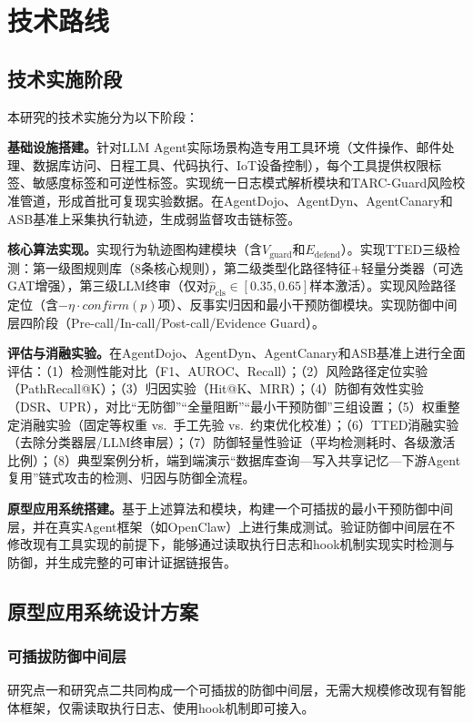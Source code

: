 \section{技术路线}

\subsection{技术实施阶段}
本研究的技术实施分为以下阶段：

\textbf{基础设施搭建。}针对LLM Agent实际场景构造专用工具环境（文件操作、邮件处理、数据库访问、日程工具、代码执行、IoT设备控制），每个工具提供权限标签、敏感度标签和可逆性标签。实现统一日志模式解析模块和TARC-Guard风险校准管道，形成首批可复现实验数据。在AgentDojo、AgentDyn、AgentCanary和ASB基准上采集执行轨迹，生成弱监督攻击链标签。

\textbf{核心算法实现。}实现行为轨迹图构建模块（含$V_{\text{guard}}$和$E_{\text{defend}}$）。实现TTED三级检测：第一级图规则库（8条核心规则），第二级类型化路径特征+轻量分类器（可选GAT增强），第三级LLM终审（仅对$\hat{p}_{\text{cls}} \in [0.35, 0.65]$样本激活）。实现风险路径定位（含$-\eta \cdot confirm(p)$项）、反事实归因和最小干预防御模块。实现防御中间层四阶段（Pre-call/In-call/Post-call/Evidence Guard）。

\textbf{评估与消融实验。}在AgentDojo、AgentDyn、AgentCanary和ASB基准上进行全面评估：（1）检测性能对比（F1、AUROC、Recall）；（2）风险路径定位实验（PathRecall@K）；（3）归因实验（Hit@K、MRR）；（4）防御有效性实验（DSR、UPR），对比“无防御”“全量阻断”“最小干预防御”三组设置；（5）权重整定消融实验（固定等权重 vs.\ 手工先验 vs.\ 约束优化校准）；（6）TTED消融实验（去除分类器层/LLM终审层）；（7）防御轻量性验证（平均检测耗时、各级激活比例）；（8）典型案例分析，端到端演示“数据库查询—写入共享记忆—下游Agent复用”链式攻击的检测、归因与防御全流程。

\textbf{原型应用系统搭建。}基于上述算法和模块，构建一个可插拔的最小干预防御中间层，并在真实Agent框架（如OpenClaw）上进行集成测试。验证防御中间层在不修改现有工具实现的前提下，能够通过读取执行日志和hook机制实现实时检测与防御，并生成完整的可审计证据链报告。

\subsection{原型应用系统设计方案}

\subsubsection{可插拔防御中间层}
研究点一和研究点二共同构成一个可插拔的防御中间层，无需大规模修改现有智能体框架，仅需读取执行日志、使用hook机制即可接入。


